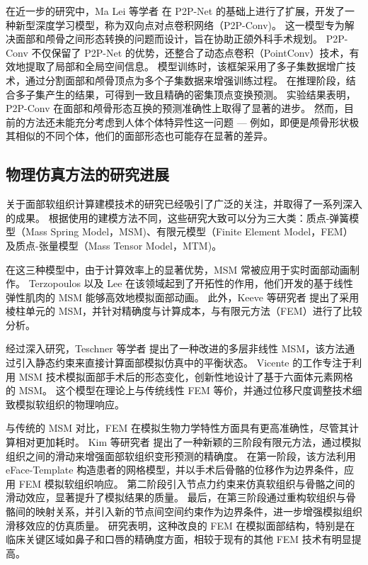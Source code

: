 在近一步的研究中，Ma Lei 等学者 \cite{maBidirectionalPredictionFacial2023} 在 P2P-Net \cite{yinP2PNETBidirectionalPoint2018} 的基础上进行了扩展，开发了一种新型深度学习模型，称为双向点对点卷积网络（P2P-Conv)。
这一模型专为解决面部和颅骨之间形态转换的问题而设计，旨在协助正颌外科手术规划。
P2P-Conv 不仅保留了 P2P-Net 的优势，还整合了动态点卷积（PointConv）技术，有效地提取了局部和全局空间信息。
模型训练时，该框架采用了多子集数据增广技术，通过分割面部和颅骨顶点为多个子集数据来增强训练过程。
在推理阶段，结合多子集产生的结果，可得到一致且精确的密集顶点变换预测。
实验结果表明，P2P-Conv 在面部和颅骨形态互换的预测准确性上取得了显著的进步。
然而，目前的方法还未能充分考虑到人体个体特异性这一问题 --- 例如，即便是颅骨形状极其相似的不同个体，他们的面部形态也可能存在显著的差异。

\subsection{物理仿真方法的研究进展}

关于面部软组织计算建模技术的研究已经吸引了广泛的关注，并取得了一系列深入的成果。
根据使用的建模方法不同，这些研究大致可以分为三大类：质点-弹簧模型（Mass Spring Model，MSM)、有限元模型（Finite Element Model，FEM）及质点-张量模型（Mass Tensor Model，MTM)。

在这三种模型中，由于计算效率上的显著优势，MSM 常被应用于实时面部动画制作。
Terzopoulos \cite{terzopoulosPhysicallyBasedFacial1990} 以及 Lee \cite{leeRealisticModelingFacial1995} 在该领域起到了开拓性的作用，他们开发的基于线性弹性肌肉的 MSM 能够高效地模拟面部动画。
此外，Keeve 等研究者 \cite{keeveDeformableModelingFacial1998} 提出了采用棱柱单元的 MSM，并针对精确度与计算成本，与有限元方法（FEM）进行了比较分析。

经过深入研究，Teschner 等学者 \cite{teschnerDirectComputationNonlinear} 提出了一种改进的多层非线性 MSM，该方法通过引入静态约束来直接计算面部模拟仿真中的平衡状态。
Vicente \cite{vicenteMaxillofacialSurgerySimulation2009} 的工作专注于利用 MSM 技术模拟面部手术后的形态变化，创新性地设计了基于六面体元素网格的 MSM。
这个模型在理论上与传统线性 FEM 等价，并通过位移尺度调整技术细致模拟软组织的物理响应。

与传统的 MSM 对比，FEM 在模拟生物力学特性方面具有更高准确性，尽管其计算相对更加耗时。
Kim 等研究者 \cite{kimClinicallyValidatedPrediction2017} 提出了一种新颖的三阶段有限元方法，通过模拟组织之间的滑动来增强面部软组织变形预测的精确度。
在第一阶段，该方法利用 eFace-Template \cite{zhangEFacetemplateMethodEfficiently2016} 构造患者的网格模型，并以手术后骨骼的位移作为边界条件，应用 FEM 模拟软组织响应。
第二阶段引入节点力约束来仿真软组织与骨骼之间的滑动效应，显著提升了模拟结果的质量。
最后，在第三阶段通过重构软组织与骨骼间的映射关系，并引入新的节点间空间约束作为边界条件，进一步增强模拟组织滑移效应的仿真质量。
研究表明，这种改良的 FEM 在模拟面部结构，特别是在临床关键区域如鼻子和口唇的精确度方面，相较于现有的其他 FEM 技术有明显提高。


